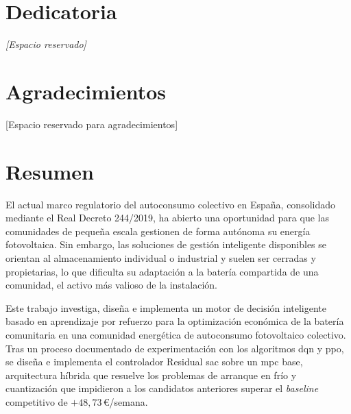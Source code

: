 \documentclass[12pt, a4paper, twoside]{report}
\begin{document}



\setcounter{page}{1}

\chapter*{Dedicatoria}
\thispagestyle{plain}
\vspace*{4cm}
\begin{flushright}\textit{[Espacio reservado]}\end{flushright}

\chapter*{Agradecimientos}
\thispagestyle{plain}
[Espacio reservado para agradecimientos]

\chapter*{Resumen}
\thispagestyle{plain}

El actual marco regulatorio del autoconsumo colectivo en España, consolidado
mediante el Real Decreto 244/2019, ha abierto una oportunidad para que las
comunidades de pequeña escala gestionen de forma autónoma su energía
fotovoltaica. Sin embargo, las soluciones de gestión inteligente disponibles se
orientan al almacenamiento individual o industrial y suelen ser cerradas y
propietarias, lo que dificulta su adaptación a la batería compartida de una
comunidad, el activo más valioso de la instalación.

Este trabajo investiga, diseña e implementa un motor de decisión inteligente
basado en aprendizaje por refuerzo para la optimización económica de la batería
comunitaria en una comunidad energética de autoconsumo fotovoltaico colectivo.
Tras un proceso documentado de experimentación con los algoritmos \acrshort{dqn}
y \acrshort{ppo}, se diseña e implementa el controlador Residual \acrshort{sac}
sobre un \acrshort{mpc} base, arquitectura híbrida que resuelve los problemas de
arranque en frío y cuantización que impidieron a los candidatos anteriores
superar el \textit{baseline} competitivo de $+48{,}73$\,€/semana.
\end{document}
